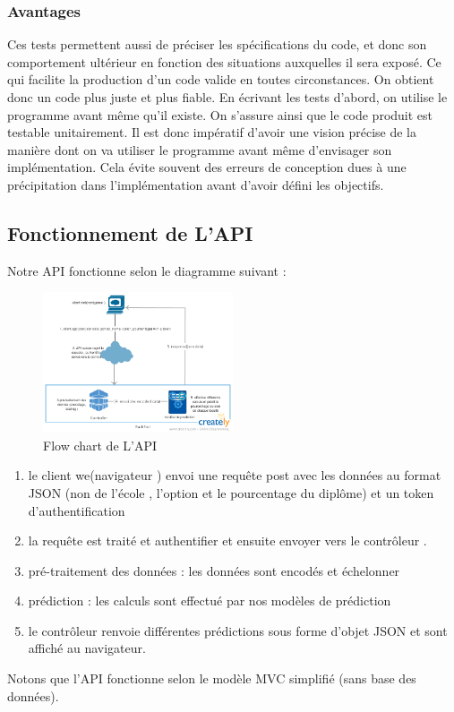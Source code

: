 \subsubsection{Avantages }
Ces tests permettent aussi de préciser les spécifications du code, et donc son comportement ultérieur en fonction des situations auxquelles il sera exposé. Ce qui facilite la production d'un code valide en toutes circonstances. On obtient donc un code plus juste et plus fiable. En écrivant les tests d'abord, on utilise le programme avant même qu'il existe. On s'assure ainsi que le code produit est testable unitairement. Il est donc impératif d'avoir une vision précise de la manière dont on va utiliser le programme avant même d'envisager son implémentation. Cela évite souvent des erreurs de conception dues à une précipitation dans l'implémentation avant d'avoir défini les objectifs.
\subsection{Fonctionnement de L'\ac{API}} 
Notre \ac{API} fonctionne selon le diagramme suivant :
\begin{figure}[H]
	\centering
	\includegraphics[width=0.5\textwidth]{fig/New-Predictive-Model.png}
	\caption{Flow chart de L'API }
	\label{fig:flowChart}
\end{figure}  
\begin{enumerate}
	\item le client we(navigateur ) envoi une requête post avec les données au format \ac{JSON} (non de l'école , l'option et le pourcentage du diplôme) et un token d'authentification 
	\item la requête est traité et authentifier et ensuite envoyer vers le contrôleur .
	\item  pré-traitement des données : les données sont encodés et échelonner 
	\item  prédiction : les calculs sont effectué par nos modèles de prédiction 
	\item le contrôleur renvoie différentes prédictions sous forme d'objet \ac{JSON} et sont affiché au navigateur.  
\end{enumerate}
Notons que l'API fonctionne selon le modèle \ac{MVC} simplifié (sans base des données).
